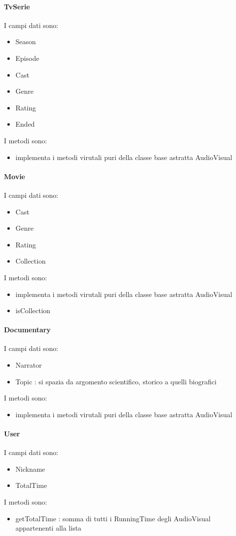 \paragraph{TvSerie}
I campi dati sono:
\begin{itemize}
    \item Season
    \item Episode
    \item Cast
    \item Genre 
    \item Rating 
    \item Ended 
\end{itemize}
I metodi sono:
\begin{itemize}
    \item implementa i metodi virutali puri della classe base astratta AudioVisual
\end{itemize}

\paragraph{Movie}
I campi dati sono:
\begin{itemize}
    \item Cast
    \item Genre
    \item Rating
    \item Collection 
\end{itemize}
I metodi sono:
\begin{itemize}
    \item implementa i metodi virutali puri della classe base astratta AudioVisual
    \item isCollection
\end{itemize}

\paragraph{Documentary}
I campi dati sono:
\begin{itemize}
    \item Narrator
    \item Topic : si spazia da argomento scientifico, storico a quelli biografici
\end{itemize}
I metodi sono:
\begin{itemize}
    \item implementa i metodi virutali puri della classe base astratta AudioVisual
\end{itemize}

\paragraph{User}
I campi dati sono:
\begin{itemize}
    \item Nickname
    \item TotalTime
\end{itemize}
I metodi sono:
\begin{itemize}
    \item getTotalTime : somma di tutti i RunningTime degli AudioVisual appartenenti alla lista
\end{itemize}
